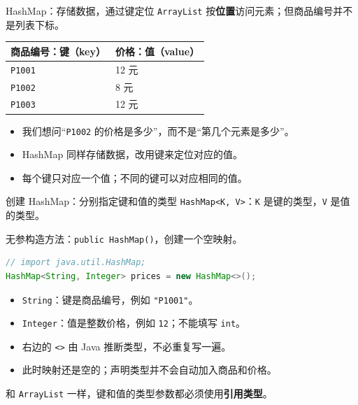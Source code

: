 \documentclass[aspectratio=169]{beamer}
\begin{document}
\begin{frame}{HashMap：存储数据，通过键定位}
  \texttt{ArrayList} 按\textbf{位置}访问元素；但商品编号并不是列表下标。
  \par\bigskip
  \begin{center}
    \renewcommand{\arraystretch}{1.3}
    \begin{tabular}{ll}
      \textbf{商品编号：键（key）} & \textbf{价格：值（value）} \\
      \hline
      \texttt{P1001} & 12 元 \\
      \texttt{P1002} & 8 元 \\
      \texttt{P1003} & 12 元 \\
    \end{tabular}
  \end{center}
  \medskip
  \begin{itemize}
    \item 我们想问“\texttt{P1002} 的价格是多少”，而不是“第几个元素是多少”。
    \item \alert{HashMap} 同样存储数据，改用键来定位对应的值。
    \item 每个键只对应一个值；不同的键可以对应相同的值。
  \end{itemize}
\end{frame}

\begin{frame}[fragile]{创建 HashMap：分别指定键和值的类型}
  \texttt{HashMap<K, V>}：\texttt{K} 是键的类型，\texttt{V} 是值的类型。
  \par\medskip
  无参构造方法：\texttt{public HashMap()}，创建一个空映射。
  \begin{lstlisting}[language=Java]
// import java.util.HashMap;
HashMap<String, Integer> prices = new HashMap<>();
  \end{lstlisting}
  \begin{itemize}
    \item \texttt{String}：键是商品编号，例如 \texttt{"P1001"}。
    \item \texttt{Integer}：值是整数价格，例如 \texttt{12}；不能填写 \texttt{int}。
    \item 右边的 \texttt{<>} 由 Java 推断类型，不必重复写一遍。
    \item 此时映射还是空的；声明类型并不会自动加入商品和价格。
  \end{itemize}
  \medskip
  和 \texttt{ArrayList} 一样，键和值的类型参数都必须使用\textbf{引用类型}。
\end{frame}
\end{document}
